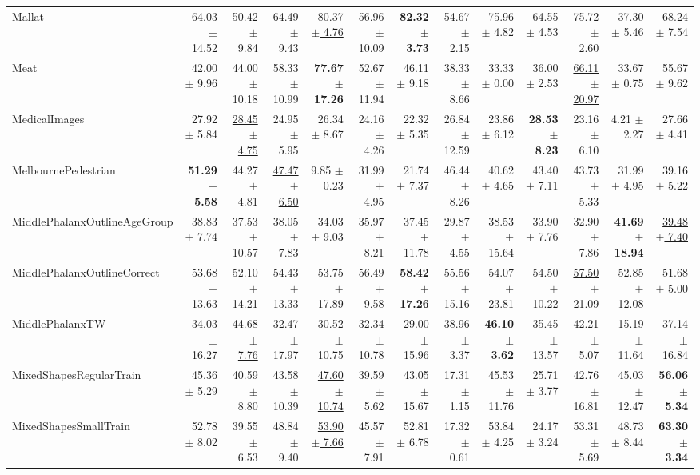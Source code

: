 \begin{landscape}
\begin{longtable}{lrrrrrrrrrrrr}
Mallat & 64.03 $\pm$ 14.52 & 50.42 $\pm$ 9.84 & 64.49 $\pm$ 9.43 & \underline{80.37 $\pm$ 4.76} & 56.96 $\pm$ 10.09 & \textbf{82.32 $\pm$ 3.73} & 54.67 $\pm$ 2.15 & 75.96 $\pm$ 4.82 & 64.55 $\pm$ 4.53 & 75.72 $\pm$ 2.60 & 37.30 $\pm$ 5.46 & 68.24 $\pm$ 7.54 \\
Meat & 42.00 $\pm$ 9.96 & 44.00 $\pm$ 10.18 & 58.33 $\pm$ 10.99 & \textbf{77.67 $\pm$ 17.26} & 52.67 $\pm$ 11.94 & 46.11 $\pm$ 9.18 & 38.33 $\pm$ 8.66 & 33.33 $\pm$ 0.00 & 36.00 $\pm$ 2.53 & \underline{66.11 $\pm$ 20.97} & 33.67 $\pm$ 0.75 & 55.67 $\pm$ 9.62 \\
MedicalImages & 27.92 $\pm$ 5.84 & \underline{28.45 $\pm$ 4.75} & 24.95 $\pm$ 5.95 & 26.34 $\pm$ 8.67 & 24.16 $\pm$ 4.26 & 22.32 $\pm$ 5.35 & 26.84 $\pm$ 12.59 & 23.86 $\pm$ 6.12 & \textbf{28.53 $\pm$ 8.23} & 23.16 $\pm$ 6.10 & 4.21 $\pm$ 2.27 & 27.66 $\pm$ 4.41 \\
MelbournePedestrian & \textbf{51.29 $\pm$ 5.58} & 44.27 $\pm$ 4.81 & \underline{47.47 $\pm$ 6.50} & 9.85 $\pm$ 0.23 & 31.99 $\pm$ 4.95 & 21.74 $\pm$ 7.37 & 46.44 $\pm$ 8.26 & 40.62 $\pm$ 4.65 & 43.40 $\pm$ 7.11 & 43.73 $\pm$ 5.33 & 31.99 $\pm$ 4.95 & 39.16 $\pm$ 5.22 \\
MiddlePhalanxOutlineAgeGroup & 38.83 $\pm$ 7.74 & 37.53 $\pm$ 10.57 & 38.05 $\pm$ 7.83 & 34.03 $\pm$ 9.03 & 35.97 $\pm$ 8.21 & 37.45 $\pm$ 11.78 & 29.87 $\pm$ 4.55 & 38.53 $\pm$ 15.64 & 33.90 $\pm$ 7.76 & 32.90 $\pm$ 7.86 & \textbf{41.69 $\pm$ 18.94} & \underline{39.48 $\pm$ 7.40} \\
MiddlePhalanxOutlineCorrect & 53.68 $\pm$ 13.63 & 52.10 $\pm$ 14.21 & 54.43 $\pm$ 13.33 & 53.75 $\pm$ 17.89 & 56.49 $\pm$ 9.58 & \textbf{58.42 $\pm$ 17.26} & 55.56 $\pm$ 15.16 & 54.07 $\pm$ 23.81 & 54.50 $\pm$ 10.22 & \underline{57.50 $\pm$ 21.09} & 52.85 $\pm$ 12.08 & 51.68 $\pm$ 5.00 \\
MiddlePhalanxTW & 34.03 $\pm$ 16.27 & \underline{44.68 $\pm$ 7.76} & 32.47 $\pm$ 17.97 & 30.52 $\pm$ 10.75 & 32.34 $\pm$ 10.78 & 29.00 $\pm$ 15.96 & 38.96 $\pm$ 3.37 & \textbf{46.10 $\pm$ 3.62} & 35.45 $\pm$ 13.57 & 42.21 $\pm$ 5.07 & 15.19 $\pm$ 11.64 & 37.14 $\pm$ 16.84 \\
MixedShapesRegularTrain & 45.36 $\pm$ 5.29 & 40.59 $\pm$ 8.80 & 43.58 $\pm$ 10.39 & \underline{47.60 $\pm$ 10.74} & 39.59 $\pm$ 5.62 & 43.05 $\pm$ 15.67 & 17.31 $\pm$ 1.15 & 45.53 $\pm$ 11.76 & 25.71 $\pm$ 3.77 & 42.76 $\pm$ 16.81 & 45.03 $\pm$ 12.47 & \textbf{56.06 $\pm$ 5.34} \\
MixedShapesSmallTrain & 52.78 $\pm$ 8.02 & 39.55 $\pm$ 6.53 & 48.84 $\pm$ 9.40 & \underline{53.90 $\pm$ 7.66} & 45.57 $\pm$ 7.91 & 52.81 $\pm$ 6.78 & 17.32 $\pm$ 0.61 & 53.84 $\pm$ 4.25 & 24.17 $\pm$ 3.24 & 53.31 $\pm$ 5.69 & 48.73 $\pm$ 8.44 & \textbf{63.30 $\pm$ 3.34} \\

\end{longtable}
\end{landscape}
